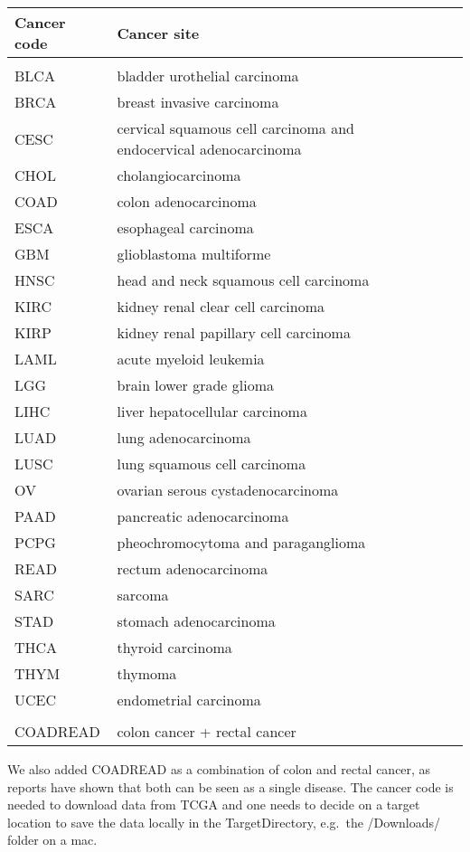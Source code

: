 \documentclass[8pt,a4,]{article}
\begin{document}
\begin{center}
\begin{tabular}{|l|l|l|l|}
\hline
Cancer code & Cancer site  \\
\hline
\\
BLCA & bladder urothelial carcinoma  \\
BRCA & breast invasive carcinoma  \\
CESC & cervical squamous cell carcinoma and endocervical adenocarcinoma\\
CHOL & cholangiocarcinoma\\
COAD & colon adenocarcinoma \\
ESCA & esophageal carcinoma\\
GBM & glioblastoma multiforme\\
HNSC & head and neck squamous cell carcinoma \\
KIRC & kidney renal clear cell carcinoma  \\
KIRP & kidney renal papillary cell carcinoma\\
LAML & acute myeloid leukemia \\
LGG & brain lower grade glioma\\
LIHC & liver hepatocellular carcinoma\\
LUAD & lung adenocarcinoma \\
LUSC & lung squamous cell carcinoma \\
OV & ovarian serous cystadenocarcinoma \\
PAAD & pancreatic adenocarcinoma\\
PCPG & pheochromocytoma and paraganglioma\\
READ & rectum adenocarcinoma \\
SARC & sarcoma\\
STAD & stomach adenocarcinoma\\
THCA & thyroid carcinoma\\
THYM & thymoma\\
UCEC & endometrial carcinoma \\
\\
COADREAD & colon cancer + rectal cancer \\
\hline
\end{tabular}
\end{center}

\newpage

We also added COADREAD as a combination of colon and rectal cancer, as
reports have shown that both can be seen as a single disease. The cancer
code is needed to download data from TCGA and one needs to decide on a
target location to save the data locally in the TargetDirectory,
e.g.~the /Downloads/ folder on a mac.
\end{document}
